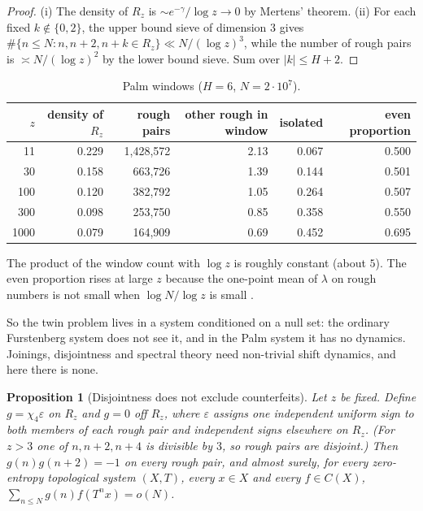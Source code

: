 \documentclass[11pt]{amsart}
\newtheorem{proposition}[theorem]{Proposition}
\theoremstyle{definition}
\theoremstyle{remark}
\begin{document}
\begin{proof}
(i) The density of $R_z$ is $\sim e^{-\gamma}/\log z\to0$ by Mertens' theorem. (ii) For each fixed $k\notin\{0,2\}$, the upper bound sieve of dimension $3$ gives $\#\{n\le N:n,n+2,n+k\in R_z\}\ll N/(\log z)^3$, while the number of rough pairs is $\asymp N/(\log z)^2$ by the lower bound sieve. Sum over $|k|\le H+2$.
\end{proof}

\begin{table}[h]
\centering\small
\caption{Palm windows ($H=6$, $N=2\cdot10^7$).}\label{tab:palm}
\begin{tabular}{rrrrrr}
\toprule
$z$ & density of $R_z$ & rough pairs & other rough in window & isolated & even proportion\\
\midrule
11 & 0.229 & 1{,}428{,}572 & 2.13 & 0.067 & 0.500\\
30 & 0.158 & 663{,}726 & 1.39 & 0.144 & 0.501\\
100 & 0.120 & 382{,}792 & 1.05 & 0.264 & 0.507\\
300 & 0.098 & 253{,}750 & 0.85 & 0.358 & 0.550\\
1000 & 0.079 & 164{,}909 & 0.69 & 0.452 & 0.695\\
\bottomrule
\end{tabular}
\end{table}

The product of the window count with $\log z$ is roughly constant (about $5$). The even proportion rises at large $z$ because the one-point mean of $\lambda$ on rough numbers is not small when $\log N/\log z$ is small \cite{Wan26c}.

So the twin problem lives in a system conditioned on a null set: the ordinary Furstenberg system does not see it, and in the Palm system it has no dynamics. Joinings, disjointness and spectral theory need non-trivial shift dynamics, and here there is none.

\begin{proposition}[Disjointness does not exclude counterfeits]\label{prop:disjoint}
Let $z$ be fixed. Define $g=\chi_4\varepsilon$ on $R_z$ and $g=0$ off $R_z$, where $\varepsilon$ assigns one independent uniform sign to both members of each rough pair and independent signs elsewhere on $R_z$. (For $z>3$ one of $n,n+2,n+4$ is divisible by $3$, so rough pairs are disjoint.) Then $g(n)g(n+2)=-1$ on every rough pair, and almost surely, for every zero-entropy topological system $(X,T)$, every $x\in X$ and every $f\in C(X)$, $\sum_{n\le N}g(n)f(T^nx)=o(N)$.
\end{proposition}
\end{document}
